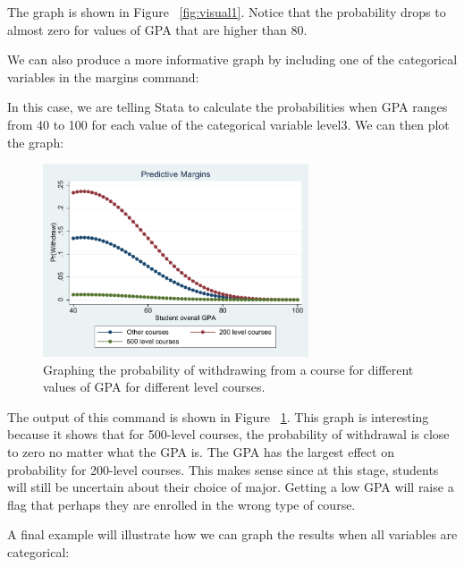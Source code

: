 \documentclass[a4paper,12pt,oneside]{book}
\begin{document}
The graph is shown in Figure ~\ref{fig:visual1}. Notice that the probability drops to almost zero for values of GPA that are higher than 80.

We can also produce a more informative graph by including one of the categorical variables in the margins command:

\begin{stlog}\end{stlog}

In this case, we are telling Stata to calculate the probabilities when GPA ranges from 40 to 100 for each value of the categorical variable level3. We can then plot the graph:

\begin{stlog}\end{stlog}
\begin{figure}[h]
    \centering
    \includegraphics[width=0.7\textwidth]{book_65.pdf}
    \caption{Graphing the probability of withdrawing from a course for different values of GPA for different level courses.}
    \label{fig:visual2}
\end{figure}

The output of this command is shown in Figure ~\ref{fig:visual2}. This graph is interesting because it shows that for 500-level courses, the probability of withdrawal is close to zero no matter what the GPA is. 
The GPA has the largest effect on probability for 200-level courses. This makes sense since at this stage, students will still be uncertain about their choice of major. Getting a low GPA will raise a 
flag that perhaps they are enrolled in the wrong type of course.

A final example will illustrate how we can graph the results when all variables are categorical:

\begin{stlog}\end{stlog}
\end{document}
